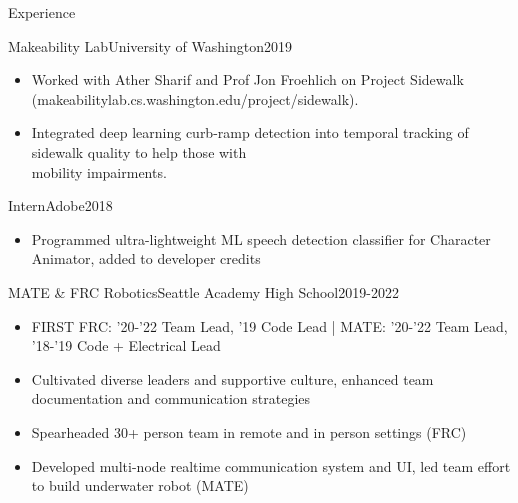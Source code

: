 \documentclass[]{mcdowellcv}
\begin{document}
\begin{cvsection}{Experience}
	\begin{cvsubsection}{Makeability Lab}{University of Washington}{2019}
		\begin{itemize}
			\item Worked with Ather Sharif and Prof Jon Froehlich on Project Sidewalk (makeabilitylab.cs.washington.edu/project/sidewalk).
			\item Integrated deep learning curb-ramp detection into temporal tracking of sidewalk quality to help those with \\ mobility impairments. \cite{SharifGSBFWDF21}
		\end{itemize}
	\end{cvsubsection}

	\begin{cvsubsection}{Intern}{Adobe}{2018}
		\begin{itemize}
			\item Programmed ultra-lightweight ML speech detection classifier for Character Animator, added to developer credits
		\end{itemize}
	\end{cvsubsection}

	\begin{cvsubsection}{MATE \& FRC Robotics}{Seattle Academy High School}{2019-2022}
		\begin{itemize}
			\item FIRST FRC:  '20-'22 Team Lead,  '19 Code Lead | MATE: '20-'22 Team Lead, '18-'19 Code + Electrical Lead
			\item Cultivated diverse leaders and supportive culture, enhanced team documentation and communication strategies
			\item Spearheaded 30+ person team in remote and in person settings (FRC)
			\item Developed multi-node realtime communication system and UI, led team effort to build underwater robot (MATE)
		\end{itemize}
	\end{cvsubsection}

\end{cvsection}
\end{document}
